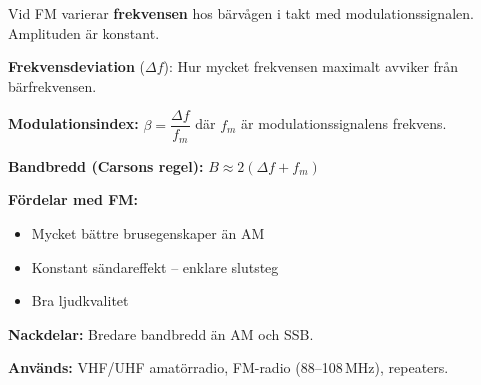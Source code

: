 \documentclass[a4paper,11pt,twoside]{book}
\newcommand{\emoji}[1]{{\emojifont #1}}
\begin{document}
\begin{bluebox}[title={\emoji{🔑} Frekvensmodulering (FM)}]
Vid FM varierar \textbf{frekvensen} hos bärvågen i takt med
modulationssignalen. Amplituden är konstant.

\medskip
\textbf{Frekvensdeviation} ($\Delta f$): Hur mycket frekvensen
maximalt avviker från bärfrekvensen.

\medskip
\textbf{Modulationsindex:} $\beta = \dfrac{\Delta f}{f_m}$
där $f_m$ är modulationssignalens frekvens.

\medskip
\textbf{Bandbredd (Carsons regel):} $B \approx 2(\Delta f + f_m)$

\medskip
\textbf{Fördelar med FM:}
\begin{itemize}
  \item Mycket bättre brusegenskaper än AM
  \item Konstant sändareffekt -- enklare slutsteg
  \item Bra ljudkvalitet
\end{itemize}

\textbf{Nackdelar:} Bredare bandbredd än AM och SSB.

\textbf{Används:} VHF/UHF amatörradio, FM-radio (88--108\,MHz),
repeaters.
\end{bluebox}
\end{document}
